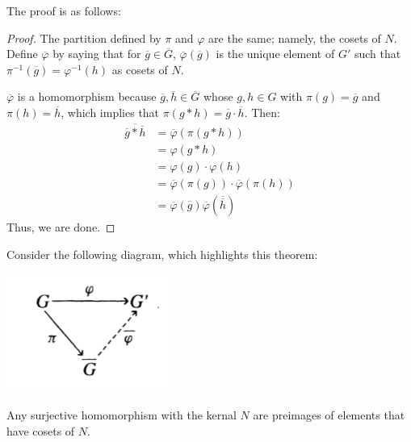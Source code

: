 \documentclass[letterpaper]{article}
\begin{document}
The proof is as follows: 
\begin{mdframed}
    \begin{proof}
        The partition defined by $\pi$ and $\varphi$ are the same; namely, the cosets of $N$. Define $\overline{\varphi}$ by saying that for $\overline{g} \in \overline{G}$, $\overline{\varphi}(\overline{g})$ is the unique element of $G'$ such that $\pi^{-1}(\overline{g}) = \varphi^{-1}(h)$ as cosets of $N$. 

        \bigskip 

        $\overline{\varphi}$ is a homomorphism because $\overline{g}, \overline{h} \in \overline{G}$ whose $g, h \in G$ with $\pi(g) = \overline{g}$ and $\pi(h) = \overline{h}$, which implies that $\pi(g * h) = \overline{g} \cdot \overline{h}$. Then: 
        \begin{equation*}
            \begin{aligned}
                \overline{\overline{g} * \overline{h}} &= \overline{\varphi}(\pi(g * h)) \\ 
                    &= \varphi(g * h) \\ 
                    &= \varphi(g) \cdot \varphi(h) \\ 
                    &= \overline{\varphi}(\pi(g)) \cdot \overline{\varphi}(\pi(h)) \\ 
                    &= \overline{\varphi}(\overline{g}) \overline{\varphi}(\overline{\overline{h}})
            \end{aligned}
        \end{equation*} 
        Thus, we are done. 
    \end{proof}
\end{mdframed}
Consider the following diagram, which highlights this theorem: 
\begin{center}
    \includegraphics[scale=0.9]{assets/first_iso.png}
\end{center}
Any surjective homomorphism with the kernal $N$ are preimages of elements that have cosets of $N$.

\bigskip 
\end{document}
